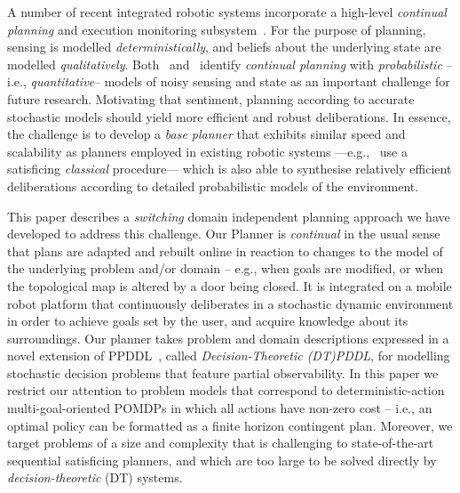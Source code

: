 



A number of recent integrated robotic systems incorporate a
high-level {\em continual planning} and execution monitoring
subsystem~\cite{wyattetal2010tamd,talamadupula:2010,Kraft2008}.
For the purpose of planning, sensing is modelled {\em
deterministically}, and beliefs about the underlying state are
modelled {\em qualitatively}.
Both~\citeauthor{talamadupula:2010} and~\citeauthor{wyattetal2010tamd}
identify
\emph{continual planning} with {\em probabilistic} --i.e., {\em quantitative}--
models of noisy sensing and state as an important challenge for future
research.
Motivating that sentiment, planning according to accurate
stochastic models should yield more efficient and robust
deliberations.
In essence, the challenge is to develop a {\em base planner} that
exhibits similar speed and scalability as planners employed in
existing robotic systems ---e.g.,~\citeauthor{wyattetal2010tamd} use a
satisficing {\em classical} procedure--- which is also able to
synthesise relatively efficient deliberations according to detailed
probabilistic models of the environment.


This paper describes a {\em switching} domain independent planning
approach we have developed to address this challenge. 
Our Planner is {\em continual} in the usual sense that plans are
adapted and rebuilt online in reaction to changes to the model of the
underlying problem and/or domain -- e.g., when goals are
modified, or when the topological map is altered by a door being
closed.
It is integrated on a mobile robot platform that continuously
deliberates in a stochastic dynamic environment in order to achieve
goals set by the user, and acquire knowledge about its surroundings.
Our planner takes problem and domain descriptions expressed in a novel
extension of PPDDL~\cite{younes:etal:2005}, called {\em
Decision-Theoretic (DT)PDDL}, for modelling stochastic decision
problems that feature partial observability.  In this paper we
restrict our attention to problem models that correspond to
deterministic-action multi-goal-oriented POMDPs%
in which all actions have
non-zero cost -- i.e., an optimal policy can be formatted as a finite
horizon contingent plan. Moreover, we target problems of a size and
complexity that is challenging to state-of-the-art sequential
satisficing planners, and which are too large to be solved directly by
{\em decision-theoretic} (DT) systems.

